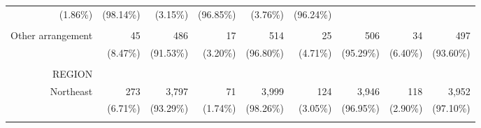 \documentclass{article}
\begin{document}
\begin{table}[!h]
{\begin{tabular}{lllllllll}
			\multicolumn{1}{r}{(1.86\%)} &
			\multicolumn{1}{r}{(98.14\%)} &
			\multicolumn{1}{r}{(3.15\%)} &
			\multicolumn{1}{r}{(96.85\%)} &
			\multicolumn{1}{r}{(3.76\%)} &
			\multicolumn{1}{r}{(96.24\%)} \\
			\multicolumn{1}{r}{} &
			\multicolumn{1}{|r}{} &
			\multicolumn{1}{r}{} &
			\multicolumn{1}{r}{} &
			\multicolumn{1}{r}{} &
			\multicolumn{1}{r}{} &
			\multicolumn{1}{r}{} &
			\multicolumn{1}{r}{} &
			\multicolumn{1}{r}{} \\
			\multicolumn{1}{r}{Other arrangement\hspace{1em}} &
			\multicolumn{1}{|r}{45} &
			\multicolumn{1}{r}{486} &
			\multicolumn{1}{r}{17} &
			\multicolumn{1}{r}{514} &
			\multicolumn{1}{r}{25} &
			\multicolumn{1}{r}{506} &
			\multicolumn{1}{r}{34} &
			\multicolumn{1}{r}{497} \\
			\multicolumn{1}{r}{} &
			\multicolumn{1}{|r}{(8.47\%)} &
			\multicolumn{1}{r}{(91.53\%)} &
			\multicolumn{1}{r}{(3.20\%)} &
			\multicolumn{1}{r}{(96.80\%)} &
			\multicolumn{1}{r}{(4.71\%)} &
			\multicolumn{1}{r}{(95.29\%)} &
			\multicolumn{1}{r}{(6.40\%)} &
			\multicolumn{1}{r}{(93.60\%)} \\
			\multicolumn{1}{r}{} &
			\multicolumn{1}{|r}{} &
			\multicolumn{1}{r}{} &
			\multicolumn{1}{r}{} &
			\multicolumn{1}{r}{} &
			\multicolumn{1}{r}{} &
			\multicolumn{1}{r}{} &
			\multicolumn{1}{r}{} &
			\multicolumn{1}{r}{} \\
			\multicolumn{1}{r}{REGION} &
			\multicolumn{1}{|r}{} &
			\multicolumn{1}{r}{} &
			\multicolumn{1}{r}{} &
			\multicolumn{1}{r}{} &
			\multicolumn{1}{r}{} &
			\multicolumn{1}{r}{} &
			\multicolumn{1}{r}{} &
			\multicolumn{1}{r}{} \\
			\multicolumn{1}{r}{Northeast\hspace{1em}} &
			\multicolumn{1}{|r}{273} &
			\multicolumn{1}{r}{3,797} &
			\multicolumn{1}{r}{71} &
			\multicolumn{1}{r}{3,999} &
			\multicolumn{1}{r}{124} &
			\multicolumn{1}{r}{3,946} &
			\multicolumn{1}{r}{118} &
			\multicolumn{1}{r}{3,952} \\
			\multicolumn{1}{r}{} &
			\multicolumn{1}{|r}{(6.71\%)} &
			\multicolumn{1}{r}{(93.29\%)} &
			\multicolumn{1}{r}{(1.74\%)} &
			\multicolumn{1}{r}{(98.26\%)} &
			\multicolumn{1}{r}{(3.05\%)} &
			\multicolumn{1}{r}{(96.95\%)} &
			\multicolumn{1}{r}{(2.90\%)} &
			\multicolumn{1}{r}{(97.10\%)} \\
			\multicolumn{1}{r}{} &
			\multicolumn{1}{|r}{} &
			\multicolumn{1}{r}{} &
			\multicolumn{1}{r}{} &

\end{tabular}}
\end{table}
\end{document}

